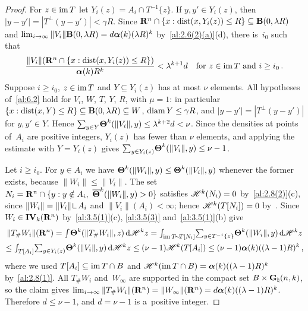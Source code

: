 \begin{proof}
    For $z \in \operatorname{im} T$ let $Y_i(z) = A_i \cap T^{-1}\{ z \}$. If $y, y' \in Y_i(z)$, then $|y - y'|
    = |T^\perp(y - y')| < \gamma R$. Since $\mathbf{R}^{n} \cap \{ x : \operatorname{dist}(x, Y_i(z)) \le R \}
    \subseteq \mathbf{B}(0,\lambda R)$ and $\lim_{i \to \infty} \|V_i\| \mathbf{B}(0,\lambda R) = d
    \boldsymbol{\alpha}(k) (\lambda R)^{k}$ by~\ref{al:2.6(2)(a)}(d), there is~$i_0$ such that
    \begin{displaymath}
        \frac{\|V_i\|(\mathbf{R}^{n} \cap \{ x : \operatorname{dist}(x,Y_i(z)) \le R \})}{\boldsymbol{\alpha}(k)
        R^{k}} < \lambda^{k+1} d \quad \text{for $z \in \operatorname{im} T$ and $i \ge i_0$} \,.
    \end{displaymath}
    Suppose $i \ge i_0$, $z \in \operatorname{im} T$ and $Y \subseteq Y_i(z)$ has at most $\nu$ elements. All
    hypotheses of~\ref{al:6.2} hold for $V_i$, $W$, $T$, $Y$, $R$, with $\mu = 1$: in particular
    $\{ x : \operatorname{dist}(x,Y) \le R \} \subseteq \mathbf{B}(0,\lambda R) \subseteq W$, $\operatorname{diam} Y \le \gamma
    R$, and $|y - y'| = |T^\perp(y - y')|$ for $y, y' \in Y$. Hence ${\textstyle\sum_{y \in Y}^{}}
    \boldsymbol{\Theta}^{k}(\|V_i\|,y) \le \lambda^{k+2} d < \nu$. Since the densities at points
    of~$A_i$ are positive integers, $Y_i(z)$ has fewer than $\nu$ elements, and applying the
    estimate with $Y = Y_i(z)$ gives ${\textstyle\sum_{y \in Y_i(z)}^{}} \boldsymbol{\Theta}^{k}(\|V_i\|,y) \le
    \nu - 1$.

    Let $i \ge i_0$. For $y \in A_i$ we have $\boldsymbol{\Theta}^{k}(\|W_i\|,y) \le
    \boldsymbol{\Theta}^{k}(\|V_i\|,y)$ whenever the former exists, because $\|W_i\| \le \|V_i\|$. The set
    $N_i = \mathbf{R}^{n} \cap \{ y : y \notin A_i,\ \boldsymbol{\overline{\Theta}}^{k}(\|W_i\|,y) > 0 \}$ satisfies
    $\mathscr{H}^{k}(N_i) = 0$ by~\ref{al:2.8(2)}(c), since $\|W_i\| = \|V_i\| \restrict A_i$ and
    $\|V_i\|(A_i) < \infty$; hence $\mathscr{H}^{k}(T[N_i]) = 0$ by~\cite[2.10.11]{Federer1969}.
    Since $W_i \in \mathbf{IV}_{k}(\mathbf{R}^{n})$ by~\ref{al:3.5(1)}(c), \ref{al:3.5(3)}
    and~\ref{al:3.5(1)}(b) give
    \begin{multline*}
        \|T_\# W_i\|(\mathbf{R}^{n}) = {\textstyle\int_{}^{}} \boldsymbol{\Theta}^{k}(\|T_\# W_i\|,z) \,\mathrm{d} \mathscr{H}^{k}
        z = {\textstyle\int_{\operatorname{im} T \!\sim\! T[N_i]}^{}} {\textstyle\sum_{y \in T^{-1}\{z\}}^{}}
        \boldsymbol{\Theta}^{k}(\|W_i\|,y) \,\mathrm{d} \mathscr{H}^{k} z \\ \le {\textstyle\int_{T[A_i]}^{}} {\textstyle\sum_{y \in
        Y_i(z)}^{}} \boldsymbol{\Theta}^{k}(\|V_i\|,y) \,\mathrm{d} \mathscr{H}^{k} z \le (\nu - 1)
        \mathscr{H}^{k}(T[A_i]) \le (\nu - 1) \boldsymbol{\alpha}(k) ((\lambda - 1) R)^{k} \,,
    \end{multline*}
    where we used $T[A_i] \subseteq \operatorname{im} T \cap B$ and $\mathscr{H}^{k}(\operatorname{im} T \cap B) =
    \boldsymbol{\alpha}(k) ((\lambda-1)R)^{k}$ by~\ref{al:2.8(1)}. All $T_\# W_i$ and~$W_\infty$
    are supported in the compact set $B \times \mathbf{G}_{\natural}(n,k)$, so the claim gives $\lim_{i
    \to \infty} \|T_\# W_i\|(\mathbf{R}^{n}) = \|W_\infty\|(\mathbf{R}^{n}) = d \boldsymbol{\alpha}(k)
    ((\lambda - 1) R)^{k}$. Therefore $d \le \nu - 1$, and $d = \nu - 1$ is a~positive
    integer.
\end{proof}


